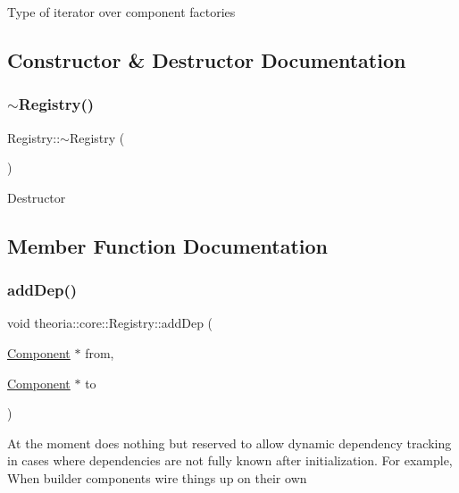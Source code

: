 Type of iterator over component factories 

\subsection{Constructor \& Destructor Documentation}
\mbox{\label{classtheoria_1_1core_1_1Registry_ac28e339aef39d9d97f1975623c8d8314}} 
\subsubsection{\texorpdfstring{$\sim$\+Registry()}{~Registry()}}
{\footnotesize\ttfamily Registry\+::$\sim$\+Registry (\begin{DoxyParamCaption}{ }\end{DoxyParamCaption})}

Destructor 

\subsection{Member Function Documentation}
\mbox{\label{classtheoria_1_1core_1_1Registry_ad5ada88f383f823f983810b70f80d67b}} 
\subsubsection{\texorpdfstring{add\+Dep()}{addDep()}}
{\footnotesize\ttfamily void theoria\+::core\+::\+Registry\+::add\+Dep (\begin{DoxyParamCaption}\item[{\hyperlink{classtheoria_1_1core_1_1Component}{Component} $\ast$}]{from,  }\item[{\hyperlink{classtheoria_1_1core_1_1Component}{Component} $\ast$}]{to }\end{DoxyParamCaption})\hspace{0.3cm}{\ttfamily [inline]}}

At the moment does nothing but reserved to allow dynamic dependency tracking in cases where dependencies are not fully known after initialization. For example, When builder components wire things up on their own \mbox{\label{classtheoria_1_1core_1_1Registry_a9d1514b8e21145742c0a850e00a90bf9}} 
